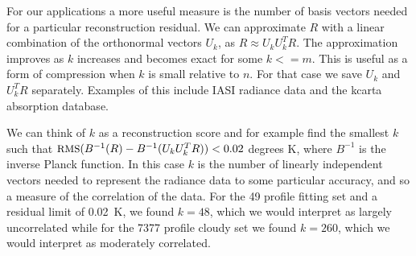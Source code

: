 \documentclass[11pt]{article}
\begin{document}
For our applications a more useful measure is the number of basis
vectors needed for a particular reconstruction residual.  We can
approximate $R$ with a linear combination of the orthonormal vectors
$U_k$, as $R\approx U_k U_k^T R$.  The approximation improves as
$k$ increases and becomes exact for some $k <= m$.  This is useful
as a form of compression when $k$ is small relative to $n$.  For
that case we save $U_k$ and $U_k^T R$ separately.  Examples of this
include IASI radiance data and the kcarta absorption database.

We can think of $k$ as a reconstruction score and for example find
the smallest $k$ such that $\mbox{\small RMS}(B^{-1}(R) - B^{-1}(U_k U_k^T R)) <
0.02$ degrees K, where $B^{-1}$ is the inverse Planck function.  In
this case $k$ is the number of linearly independent vectors needed
to represent the radiance data to some particular accuracy, and so a
measure of the correlation of the data.  For the 49 profile fitting
set and a residual limit of 0.02~K, we found $k=48$, which we would
interpret as largely uncorrelated while for the 7377 profile cloudy
set we found $k=260$, which we would interpret as moderately
correlated.

\FloatBarrier


\end{document}
